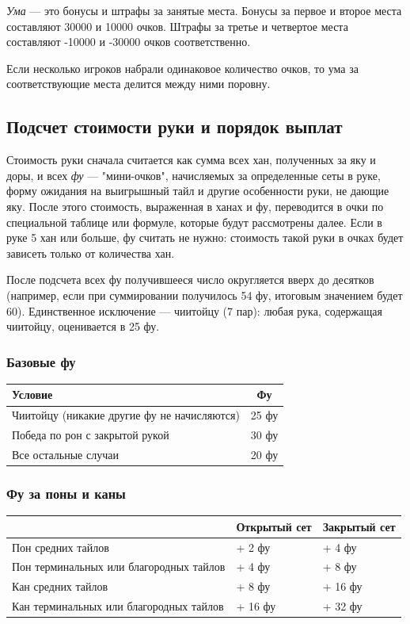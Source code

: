 \textit{Ума} --- это бонусы и штрафы за занятые места.
Бонусы за первое и второе места составляют 30000 и 10000 очков. Штрафы за третье и четвертое места составляют -10000 и -30000 очков соответственно.

Если несколько игроков набрали одинаковое количество очков, то ума за соответствующие места делится между ними поровну.

\subsection{Подсчет стоимости руки и порядок выплат}

Стоимость руки сначала считается как сумма всех хан, полученных за яку и доры, и всех \textit{фу} --- "мини-очков", начисляемых за определенные сеты в руке, форму ожидания на выигрышный тайл и другие особенности руки, не дающие яку. После этого стоимость, выраженная в ханах и фу, переводится в очки по специальной таблице или формуле, которые будут рассмотрены далее. Если в руке 5 хан или больше, фу считать не нужно: стоимость такой руки в очках будет зависеть только от количества хан.

 После подсчета всех фу получившееся число округляется вверх до десятков (например, если при суммировании получилось 54 фу, итоговым значением будет 60). Единственное исключение --- чиитойцу (7 пар): любая рука, содержащая чиитойцу, оценивается в 25 фу.

\subsubsection{Базовые фу}

\begin{tabular}{lc}
	\toprule
	Условие & Фу\\
	\midrule
	Чиитойцу (никакие другие фу не начисляются) & 25 фу\\
	\midrule
	Победа по рон с закрытой рукой & 30 фу\\
	\midrule
	Все остальные случаи & 20 фу\\
	\bottomrule
\end{tabular}

\subsubsection{Фу за поны и каны}

\noindent\begin{tabular}{L{7cm}C{3cm}C{3cm}}
	\toprule
	& Открытый сет &
	Закрытый сет \\
	\midrule
	Пон средних тайлов &
	+ 2 фу &
	+ 4 фу \\
	\midrule
	Пон терминальных или благородных тайлов &
	+ 4 фу &
	+ 8 фу \\
	\midrule
	Кан средних тайлов &
	+ 8 фу &
	+ 16 фу \\
	\midrule
	Кан терминальных или благородных тайлов &
	+ 16 фу &
	+ 32 фу \\
	\bottomrule
\end{tabular}

